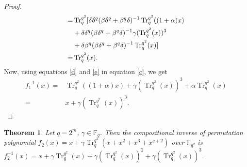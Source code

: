 \documentclass{birkjour}
\newtheorem{thm}{Theorem}[section]
\theoremstyle{definition}
\theoremstyle{remark}
\numberwithin{equation}{section}
\begin{document}
\begin{proof}
\begin{align}
   	=&\operatorname{Tr}_{q}^{q^2}[\delta\delta^{q}(\beta\delta^{q}+\beta^{q}\delta)^{-1}\operatorname{Tr}_{q}^{q^2}((1+\alpha)x)\notag\\&+\delta\delta^{q}(\beta\delta^{q}+\beta^{q}\delta)^{-1}\gamma(\operatorname{Tr}_{q}^{q^2}(x))^3\notag\\&+\delta\beta^{q}(\beta\delta^{q}+\beta^{q}\delta)^{-1}\operatorname{Tr}_{q}^{q^2}(x)]\notag\\
   	=&\operatorname{Tr}_{q}^{q^2}(x).\label{e}
   \end{align}
  Now, using equations \ref{d} and \ref{e} in equation \ref{c}, we get
   \begin{align*}
   f_1^{-1}(x)=&\operatorname{Tr}_{q}^{q^2}((1+\alpha)x)+\gamma(\operatorname{Tr}_{q}^{q^2}(x))^3+\alpha\operatorname{Tr}_{q}^{q^2}(x)\\
   =&x+\gamma(\operatorname{Tr}_{q}^{q^2}(x))^3.
\end{align*}
	\end{proof}
	\begin{thm}Let $q=2^m$, $\gamma\in \mathbb{F}_q$. Then the compositional inverse of permutation polynomial 
			$f_2(x)=x+\gamma\operatorname{Tr}_{q}^{q^2}(x+x^2+x^3+x^{q+2})$ over $\mathbb{F}_{q^2}$ is
		$f_2^{-1}(x)=x+\gamma\operatorname{Tr}_{q}^{q^2}(x)+\gamma(\operatorname{Tr}_{q}^{q^2}(x))^2+\gamma(\operatorname{Tr}_{q}^{q^2}(x))^3$.
	\end{thm}
\end{document}

